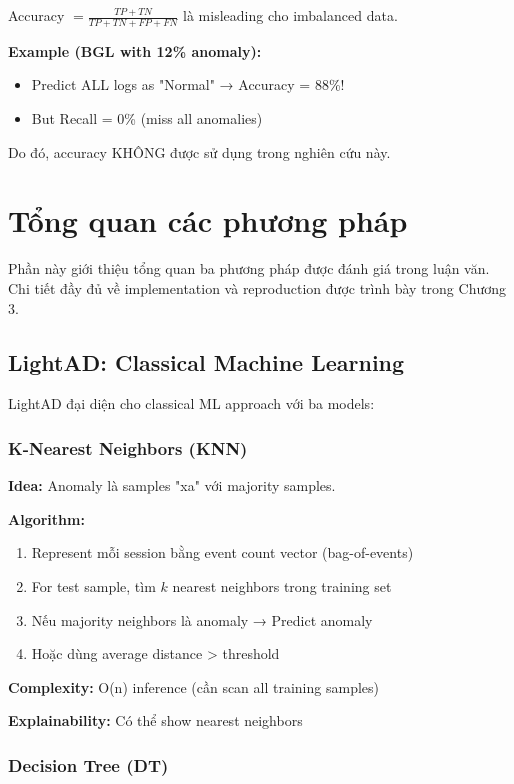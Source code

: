Accuracy $= \frac{TP + TN}{TP + TN + FP + FN}$ là misleading cho imbalanced data.

\textbf{Example (BGL with 12\% anomaly):}
\begin{itemize}
    \item Predict ALL logs as "Normal" → Accuracy = 88\%!
    \item But Recall = 0\% (miss all anomalies)
\end{itemize}

Do đó, accuracy KHÔNG được sử dụng trong nghiên cứu này.

\section{Tổng quan các phương pháp}
\label{sec:methods-overview}

Phần này giới thiệu tổng quan ba phương pháp được đánh giá trong luận văn. Chi tiết đầy đủ về implementation và reproduction được trình bày trong Chương 3.

\subsection{LightAD: Classical Machine Learning}

LightAD \cite{yu2024lightad} đại diện cho classical ML approach với ba models:

\subsubsection{K-Nearest Neighbors (KNN)}

\textbf{Idea:} Anomaly là samples "xa" với majority samples.

\textbf{Algorithm:}
\begin{enumerate}
    \item Represent mỗi session bằng event count vector (bag-of-events)
    \item For test sample, tìm $k$ nearest neighbors trong training set
    \item Nếu majority neighbors là anomaly → Predict anomaly
    \item Hoặc dùng average distance > threshold
\end{enumerate}

\textbf{Complexity:} O(n) inference (cần scan all training samples)

\textbf{Explainability:} Có thể show nearest neighbors

\subsubsection{Decision Tree (DT)}

